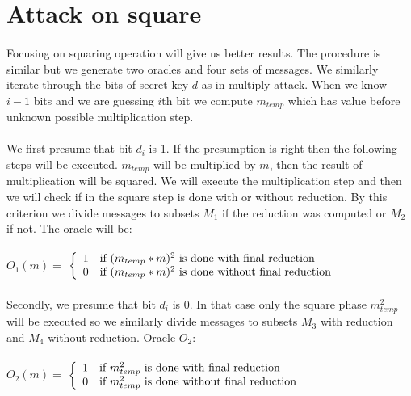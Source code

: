 \documentclass[thesis=B,english]{FITthesis}[2012/10/20]
\begin{document}
{\section{Attack on square}
\paragraph*{}{
Focusing on squaring operation will give us better results. The procedure is similar but we generate two oracles and four sets of messages. We similarly iterate
through the bits of secret key \(d\) as in multiply attack. When we know \( i - 1 \) bits and we are guessing \(i\)th bit we compute \(m_{temp}\) 
which has value before unknown possible multiplication step.\cite{Dhem}
}
\paragraph*{}{
We first presume that bit \(d_i\) is 1. If the presumption is right then the following steps will be executed. \(m_{temp}\) will be multiplied by \(m\), 
then the result of multiplication will be squared. We will execute the multiplication step and then we will check if in the square step is done with or without reduction.
By this criterion we divide messages to subsets \(M_1\) if the reduction was computed or \(M_2\) if not. The oracle will be:
}
\paragraph*{}
\( O_1(m) =\) $\left\{
  \begin{array}{cl}
    \text{1} & \text{\mbox{if}  \((m_{temp} * m)^2\) is done with final reduction} \\
    \text{0} & \text{\mbox{if}  \((m_{temp} * m)^2\) is done without final reduction} 
  \end{array}
\right.$
\paragraph*{}{
Secondly, we presume that bit \(d_i\) is 0. In that case only the square phase \(m_{temp}^2\) will be executed so we similarly divide messages to subsets \(M_3\) with reduction and 
\(M_4\) without reduction. Oracle \(O_2\):
}


\paragraph*{}
\( O_2(m) =\) $\left\{
  \begin{array}{cl}
    \text{1} & \text{\mbox{if}  \(m_{temp}^2\) is done with final reduction} \\
    \text{0} & \text{\mbox{if}  \(m_{temp}^2\) is done without final reduction} 
  \end{array}
\right.$

}
\end{document}
